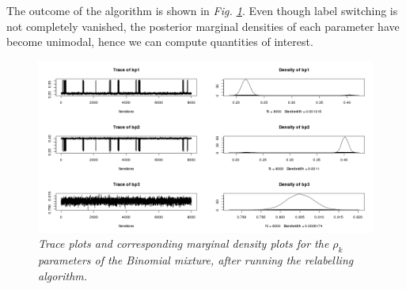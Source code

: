 The outcome of the algorithm is shown in \emph{Fig. \ref{labelBP-stephens-pic}}. Even though label switching is not completely vanished, the posterior marginal densities of each parameter have become unimodal, hence we can compute quantities of interest.
\begin{figure}[!ht]
\begin{center}
 \includegraphics[scale = 0.39]{images/labelBP-stephens.png}
\caption{\emph{Trace plots and corresponding marginal density plots for the $\rho_{k}$ parameters of the Binomial mixture, after running the \citet{Stephens2000} relabelling algorithm.}}
\label{labelBP-stephens-pic}
\end{center}
\end{figure}
